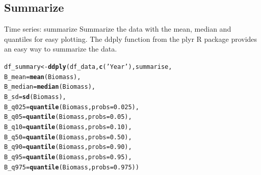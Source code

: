 \documentclass{beamer}\usepackage[]{graphicx}\usepackage[]{color}
\makeatletter
\newcommand{\hlnum}[1]{\textcolor[rgb]{0.686,0.059,0.569}{#1}}%
\newcommand{\hlstr}[1]{\textcolor[rgb]{0.192,0.494,0.8}{#1}}%
\newcommand{\hlstd}[1]{\textcolor[rgb]{0.345,0.345,0.345}{#1}}%
\newcommand{\hlkwb}[1]{\textcolor[rgb]{0.69,0.353,0.396}{#1}}%
\newcommand{\hlkwc}[1]{\textcolor[rgb]{0.333,0.667,0.333}{#1}}%
\newcommand{\hlkwd}[1]{\textcolor[rgb]{0.737,0.353,0.396}{\textbf{#1}}}%
\newenvironment{kframe}{%
 \def\at@end@of@kframe{}%
 \ifinner\ifhmode%
  \def\at@end@of@kframe{\end{minipage}}%
  \begin{minipage}{\columnwidth}%
 \fi\fi%
 \def\FrameCommand##1{\hskip\@totalleftmargin \hskip-\fboxsep
 \colorbox{shadecolor}{##1}\hskip-\fboxsep
     \hskip-\linewidth \hskip-\@totalleftmargin \hskip\columnwidth}%
 \MakeFramed {\advance\hsize-\width
   \@totalleftmargin\z@ \linewidth\hsize
   \@setminipage}}%
 {\par\unskip\endMakeFramed%
 \at@end@of@kframe}
\newenvironment{knitrout}{}{} %
\makeatother
\begin{document}
\subsection{Summarize}
\begin{frame}[fragile]{Time series: summarize}
Summarize the data with the mean, median and quantiles for easy plotting.
The ddply function from the plyr R package provides an easy way to summarize the data.
\begin{knitrout}\footnotesize
{}\color{fgcolor}\begin{kframe}
\begin{alltt}
\hlstd{df_summary} \hlkwb{<-} \hlkwd{ddply}\hlstd{(df_data,} \hlkwd{c}\hlstd{(}\hlstr{'Year'}\hlstd{), summarise,}
                    \hlkwc{B_mean}\hlstd{=}\hlkwd{mean}\hlstd{(Biomass),}
                    \hlkwc{B_median}\hlstd{=}\hlkwd{median}\hlstd{(Biomass),}
                    \hlkwc{B_sd}\hlstd{=}\hlkwd{sd}\hlstd{(Biomass),}
                    \hlkwc{B_q025}\hlstd{=}\hlkwd{quantile}\hlstd{(Biomass,} \hlkwc{probs} \hlstd{=} \hlnum{0.025}\hlstd{),}
                    \hlkwc{B_q05}\hlstd{=}\hlkwd{quantile}\hlstd{(Biomass,} \hlkwc{probs} \hlstd{=} \hlnum{0.05}\hlstd{),}
                    \hlkwc{B_q10}\hlstd{=}\hlkwd{quantile}\hlstd{(Biomass,} \hlkwc{probs} \hlstd{=} \hlnum{0.10}\hlstd{),}
                    \hlkwc{B_q50}\hlstd{=}\hlkwd{quantile}\hlstd{(Biomass,} \hlkwc{probs} \hlstd{=} \hlnum{0.50}\hlstd{),}
                    \hlkwc{B_q90}\hlstd{=}\hlkwd{quantile}\hlstd{(Biomass,} \hlkwc{probs} \hlstd{=} \hlnum{0.90}\hlstd{),}
                    \hlkwc{B_q95}\hlstd{=}\hlkwd{quantile}\hlstd{(Biomass,} \hlkwc{probs} \hlstd{=} \hlnum{0.95}\hlstd{),}
                    \hlkwc{B_q975}\hlstd{=}\hlkwd{quantile}\hlstd{(Biomass,} \hlkwc{probs} \hlstd{=} \hlnum{0.975}\hlstd{))}
\end{alltt}
\end{kframe}
\end{knitrout}
\end{frame}
\end{document}
